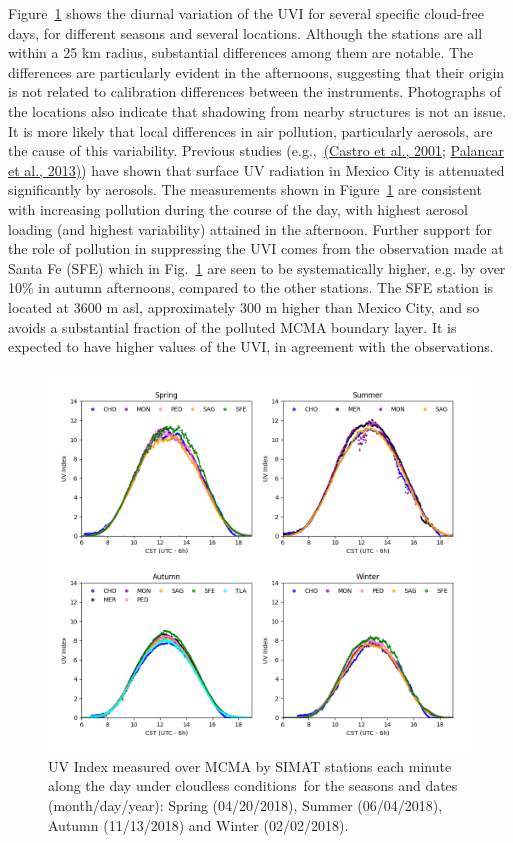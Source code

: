 \documentclass[10pt]{article}
\begin{document}
Figure~{\ref{358425}} shows the diurnal variation of
the UVI for several specific cloud-free days, for different seasons and
several locations. Although the stations are all within a 25 km radius,
substantial differences among them are notable. The differences are
particularly evident in the afternoons, suggesting that their origin is
not related to calibration differences between the instruments.
Photographs of the locations also indicate that shadowing from nearby
structures is not an issue. It is more likely that local differences in
air pollution, particularly aerosols, are the cause of this variability.
Previous studies (e.g.,~\hyperref[csl:14]{(Castro et al., 2001}; \hyperref[csl:13]{Palancar et al., 2013)}) have shown that surface UV
radiation in Mexico City is attenuated significantly by aerosols. The
measurements shown in Figure~{\ref{358425}} are
consistent with increasing pollution during the course of the day, with
highest aerosol loading (and highest variability) attained in the
afternoon. Further support for the role of pollution in suppressing the
UVI comes from the observation made at Santa Fe (SFE) which in
Fig.~{\ref{358425}} are seen to be systematically
higher, e.g. by over 10\% in autumn afternoons, compared to the other
stations. The SFE station is located at 3600 m asl, approximately 300 m
higher than Mexico City, and so avoids a substantial fraction of the
polluted MCMA boundary layer. It is expected to have higher values of
the UVI, in agreement with the observations.
\begin{figure}[H]
\begin{center}
\includegraphics[width=0.98\columnwidth]{figures/days}
\caption{{UV Index measured over MCMA by SIMAT stations each minute along the day
under cloudless conditions~for the seasons and dates (month/day/year):
Spring (04/20/2018), Summer (06/04/2018),~ Autumn (11/13/2018) and
Winter (02/02/2018).
{\label{358425}}%
}}
\end{center}
\end{figure}
\end{document}
